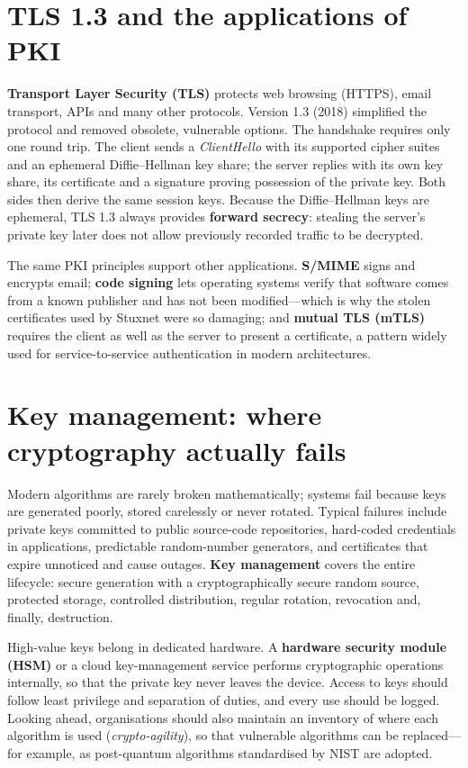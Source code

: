 \section{TLS 1.3 and the applications of PKI}\label{sec:7.5}
\textbf{Transport Layer Security (TLS)} protects web browsing (HTTPS), email transport, APIs and many other protocols. Version 1.3 (2018) simplified the protocol and removed obsolete, vulnerable options. The handshake requires only one round trip. The client sends a \emph{ClientHello} with its supported cipher suites and an ephemeral Diffie–Hellman key share; the server replies with its own key share, its certificate and a signature proving possession of the private key. Both sides then derive the same session keys. Because the Diffie–Hellman keys are ephemeral, TLS 1.3 always provides \textbf{forward secrecy}: stealing the server's private key later does not allow previously recorded traffic to be decrypted.

The same PKI principles support other applications. \textbf{S/MIME} signs and encrypts email; \textbf{code signing} lets operating systems verify that software comes from a known publisher and has not been modified—which is why the stolen certificates used by Stuxnet were so damaging; and \textbf{mutual TLS (mTLS)} requires the client as well as the server to present a certificate, a pattern widely used for service-to-service authentication in modern architectures.

\section{Key management: where cryptography actually fails}\label{sec:7.6}
Modern algorithms are rarely broken mathematically; systems fail because keys are generated poorly, stored carelessly or never rotated. Typical failures include private keys committed to public source-code repositories, hard-coded credentials in applications, predictable random-number generators, and certificates that expire unnoticed and cause outages. \textbf{Key management} covers the entire lifecycle: secure generation with a cryptographically secure random source, protected storage, controlled distribution, regular rotation, revocation and, finally, destruction.

High-value keys belong in dedicated hardware. A \textbf{hardware security module (HSM)} or a cloud key-management service performs cryptographic operations internally, so that the private key never leaves the device. Access to keys should follow least privilege and separation of duties, and every use should be logged. Looking ahead, organisations should also maintain an inventory of where each algorithm is used (\emph{crypto-agility}), so that vulnerable algorithms can be replaced—for example, as post-quantum algorithms standardised by NIST are adopted.

